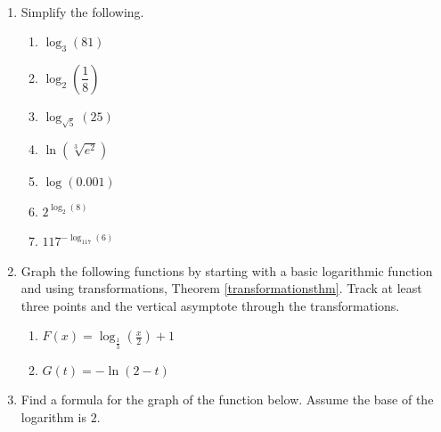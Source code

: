 \documentclass{ximera}
\begin{document}
\begin{example}  \label{intrologex} $~$

\begin{enumerate}

\item Simplify the following.

\begin{enumerate}

\item  $\log_{3}(81)$ 

\item  $\log_{2}\left(\dfrac{1}{8}\right)$

\item  $\log_{\sqrt{5}}(25)$

\item  $\ln\left(\sqrt[3]{e^2}\right)$ 

\item  $\log(0.001)$ 

\item  $2^{\log_{2}(8)}$

\item  $117^{-\log_{117}(6)}$

\end{enumerate}


\item  Graph the following functions by starting with a basic  logarithmic function and using transformations, Theorem \ref{transformationsthm}.  Track at least three points and the vertical asymptote through the transformations.


\begin{enumerate}

\item  $F(x) = \log_{\frac{1}{3}} \left( \frac{x}{2} \right) + 1$ 

\item  $G(t) =-\ln(2-t)$ 

\end{enumerate}


\item \label{findformulaforlogexample} Find a formula for the graph of the function below.  Assume the base of the logarithm is $2$.


\end{enumerate}
\end{example}
\end{document}
